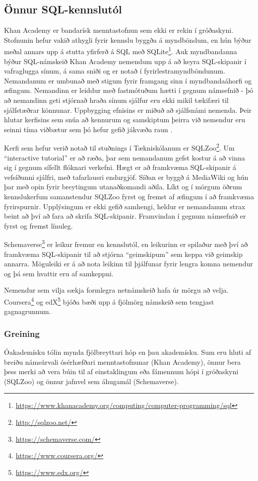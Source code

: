 \documentclass[a4paper,12pt,twoside,BCOR=10mm]{scrbook}
\begin{document}
\subsection{Önnur SQL-kennslutól}
\label{sec:other-sql-teaching-tools}
Khan Academy er bandarísk menntastofnun sem ekki er rekin í gróðaskyni. Stofnunin hefur vakið athygli fyrir kennslu byggða á myndböndum, en hún býður meðal annars upp á stutta yfirferð á SQL með SQLite\footnote{\url{https://www.khanacademy.org/computing/computer-programming/sql}}. Auk myndbandanna býður SQL-námskeið Khan Academy nemendum upp á að keyra SQL-skipanir í vafraglugga sínum, á sama sniði og er notað í fyrirlestramyndböndunum. Nemandanum er umbunað með stigum fyrir framgang sinn í myndbandaáhorfi og æfingum. Nemandinn er leiddur með fastmótuðum hætti í gegnum námsefnið - þó að nemandinn geti stjórnað hraða sínum sjálfur eru ekki mikil tækifæri til sjálfstæðrar könnunar. Uppbygging efnisins er miðuð að sjálfsnámi nemenda. Þeir hlutar kerfisins sem snúa að kennurum og samskiptum þeirra við nemendur eru seinni tíma viðbætur sem þó hefur gefið jákvæða raun \cite{murphy2014research}.

Kerfi sem hefur verið notað til stuðnings í Tækniskólanum er SQLZoo\footnote{\url{http://sqlzoo.net/}}. Um ``interactive tutorial'' er að ræða, þar sem nemandanum gefst kostur á að vinna sig í gegnum sífellt flóknari verkefni. Hægt er að framkvæma SQL-skipanir á vefsíðunni sjálfri, með tafarlausri endurgjöf. Síðan er byggð á MediaWiki og hún þar með opin fyrir breytingum utanaðkomandi aðila.
Líkt og í mörgum öðrum kennslukerfum samanstendur SQLZoo fyrst og fremst af æfingum í að framkvæma fyrirspurnir. Upplýsingum er ekki gefið samhengi, heldur er nemandanum strax beint að því að fara að skrifa SQL-skipanir. Framvindan í gegnum námsefnið er fyrst og fremst línuleg.

Schemaverse\footnote{\url{https://schemaverse.com/}} er leikur fremur en kennslutól, en leikurinn er spilaður með því að framkvæma SQL-skipanir til að stjórna ``geimskipum'' sem keppa við geimskip annarra. Möguleiki er á að nota leikinn til þjálfunar fyrir lengra komna nemendur og þá sem hvattir eru af samkeppni.

Nemendur sem vilja sækja formlegra netnámskeið hafa úr mörgu að velja. Coursera\footnote{\url{https://www.coursera.org/}} og edX\footnote{\url{https://www.edx.org/}} bjóða bæði upp á fjölmörg námskeið sem tengjast gagnagrunnum.

\subsubsection{Greining}
Óakademísku tólin mynda fjölbreyttari hóp en þau akademísku. Sum eru hluti af breiðu námsúrvali ósérhæfðari menntastofnunar (Khan Academy), önnur bera þess merki að vera búin til af einstaklingum eða fámennum hópi í gróðaskyni (SQLZoo) og önnur jafnvel sem áhugamál (Schemaverse).
\end{document}
